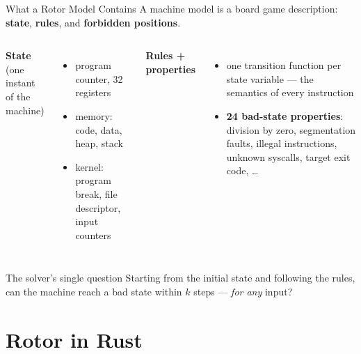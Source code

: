 \documentclass[aspectratio=169]{beamer}
\newcommand{\keylab}[1]{\textbf{\color{blue!55!black}#1}}
\begin{document}
\begin{frame}{What a Rotor Model Contains}
  A machine model is a board game description: \keylab{state},
  \keylab{rules}, and \keylab{forbidden positions}.
  \vspace{0.05cm}
  \begin{columns}[T]
      \textbf{State} (one instant of the machine)
      \begin{itemize}\setlength\itemsep{0.2em}
        \item program counter, 32 registers
        \item memory: code, data, heap, stack
        \item kernel: program break, file descriptor, input counters
      \end{itemize}
      \textbf{Rules + properties}
      \begin{itemize}\setlength\itemsep{0.2em}
        \item one transition function per state variable ---
              the semantics of every instruction
        \item \textbf{24 bad-state properties}: division by zero,
              segmentation faults, illegal instructions, unknown
              syscalls, target exit code, \dots
      \end{itemize}
  \end{columns}
  \vspace{0.15cm}
  \begin{block}{The solver's single question}
    Starting from the initial state and following the rules, can the
    machine reach a bad state within $k$ steps --- \emph{for any} input?
  \end{block}
\end{frame}

\part{Rotor in Rust}
\begin{frame}
  \partpage
\end{frame}
\end{document}

